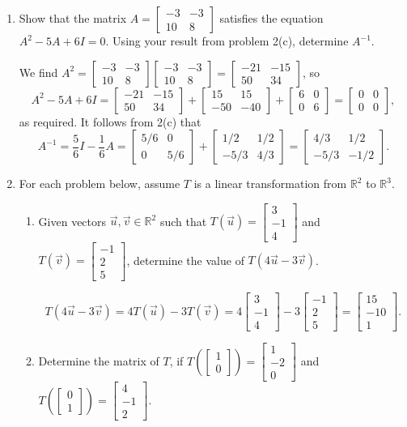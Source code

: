 \documentclass[12pt]{article}
\newcommand{\R}{\mathbb{R}}
\newcommand{\bbm}{\begin{bmatrix}}
\newcommand{\ebm}{\end{bmatrix}}
\begin{document}
\begin{enumerate}
\bigskip

\item Show that the matrix $A=\bbm -3&-3\\10&8\ebm$ satisfies the equation $A^2-5A+6I=0$. Using your result from problem 2(c), determine $A^{-1}$.

We find $A^2 = \bbm -3&-3\\10&8\ebm\bbm -3&-3\\10&8\ebm=\bbm -21&-15\\50&34\ebm$, so
\[
A^2-5A+6I = \bbm -21&-15\\50&34\ebm+\bbm 15&15\\-50&-40\ebm + \bbm 6&0\\0&6\ebm = \bbm 0&0\\0&0\ebm,
\]
as required. It follows from 2(c) that
\[
A^{-1} = \frac56 I-\frac16 A = \bbm 5/6 &0\\0&5/6\ebm+\bbm 1/2&1/2\\-5/3&4/3\ebm = \bbm 4/3&1/2\\-5/3&-1/2\ebm.
\]
\newpage

\item For each problem below, assume $T$ is a linear transformation from $\R^2$ to $\R^3$.
\begin{enumerate}
\item Given vectors $\vec{u},\vec{v}\in\R^2$ such that $T(\vec{u})=\bbm 3\\-1\\4\ebm$ and $T(\vec{v})=\bbm -1\\2\\5\ebm$, determine the value of $T(4\vec{u}-3\vec{v})$.

\[
T(4\vec{u}-3\vec{v})=4T(\vec{u})-3T(\vec{v})=4\bbm 3\\-1\\4\ebm-3\bbm -1\\2\\5\ebm = \bbm 15\\-10\\1\ebm.
\]

\item Determine the matrix of $T$, if $T\left(\bbm 1\\0\ebm\right)=\bbm 1\\-2\\0\ebm$ and $T\left(\bbm 0\\1\ebm\right) = \bbm 4\\-1\\2\ebm$.

\bigskip


\end{enumerate}
\end{enumerate}
\end{document}
